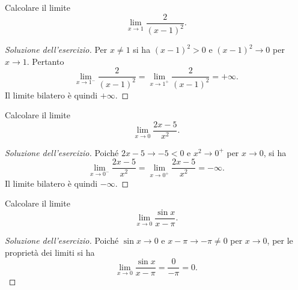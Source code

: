 \begin{exercise}
\label{ex:limiti-foglio-2311-11}
Calcolare il limite
\[
  \lim_{x\to1}\frac2{(x-1)^2}.
\]
\end{exercise}
\begin{proof}[Soluzione dell'esercizio]
Per $x\ne1$ si ha $(x-1)^2>0$ e $(x-1)^2\to0$ per $x\to1$.
Pertanto
\[
  \lim_{x\to1^-}\frac2{(x-1)^2}
  =\lim_{x\to1^+}\frac2{(x-1)^2}=+\infty.
\]
Il limite bilatero è quindi $+\infty$.
\end{proof}

\begin{exercise}
\label{ex:limiti-foglio-2311-15}
Calcolare il limite
\[
  \lim_{x\to0}\frac{2x-5}{x^2}.
\]
\end{exercise}
\begin{proof}[Soluzione dell'esercizio]
Poiché $2x-5\to-5<0$ e $x^2\to0^+$ per $x\to0$,
si ha
\[
  \lim_{x\to0^-}\frac{2x-5}{x^2}
  =\lim_{x\to0^+}\frac{2x-5}{x^2}=-\infty.
\]
Il limite bilatero è quindi $-\infty$.
\end{proof}

\begin{exercise}
\label{ex:limiti-foglio-2311-22}
Calcolare il limite
\[
  \lim_{x\to0}\frac{\sin x}{x-\pi}.
\]
\end{exercise}
\begin{proof}[Soluzione dell'esercizio]
Poiché $\sin x\to0$ e $x-\pi\to-\pi\ne0$ per $x\to0$,
per le proprietà dei limiti si ha
\[
  \lim_{x\to0}\frac{\sin x}{x-\pi}
  =\frac0{-\pi}=0.
\]
\end{proof}
